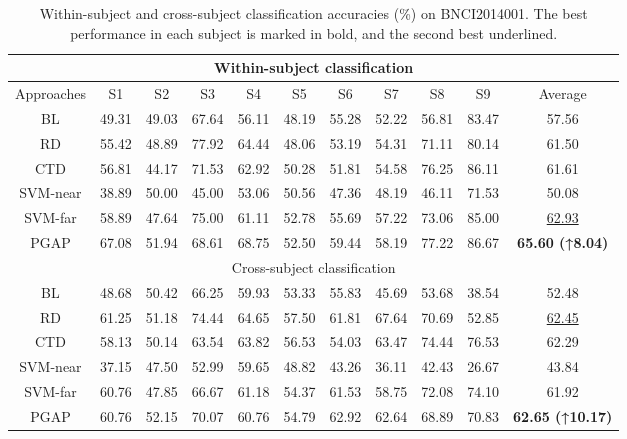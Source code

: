 \documentclass[journal,twocolumn]{IEEEtran}
\begin{document}
\begin{table}[htpb] \centering
  \caption{Within-subject and cross-subject classification accuracies (\%) on BNCI2014001. The best performance in each subject is marked in bold, and the second best underlined.}
  \label{tab:2014001-result}
  \begin{tabular}{c|c|c|c|c|c|c|c|c|c|c}
  \toprule
  \multicolumn{11}{c}{Within-subject classification} \\
  \midrule
  Approaches & S1 & S2 & S3 & S4 & S5 & S6 & S7 & S8 & S9 & Average \\
  \midrule
  BL & 49.31 & 49.03 & 67.64 & 56.11 & 48.19 & 55.28 & 52.22 & 56.81 & 83.47 & 57.56 \\
  RD & 55.42 & 48.89 & 77.92 & 64.44 & 48.06 & 53.19 & 54.31 & 71.11 & 80.14 & 61.50 \\
  CTD & 56.81 & 44.17 & 71.53 & 62.92 & 50.28 & 51.81 & 54.58 & 76.25 & 86.11 & 61.61 \\
  SVM-near & 38.89 & 50.00 & 45.00 & 53.06 & 50.56 & 47.36 & 48.19 & 46.11 & 71.53 & 50.08 \\
  SVM-far & 58.89 & 47.64 & 75.00 & 61.11 & 52.78 & 55.69 & 57.22 & 73.06 & 85.00 & \underline{62.93} \\
  PGAP & 67.08 & 51.94 & 68.61 & 68.75 & 52.50 & 59.44 & 58.19 & 77.22 & 86.67 & \textbf{65.60 (↑8.04)} \\
  \midrule
  \multicolumn{11}{c}{Cross-subject classification} \\
  \midrule
  BL & 48.68 & 50.42 & 66.25 & 59.93 & 53.33 & 55.83 & 45.69 & 53.68 & 38.54 & 52.48 \\
  RD & 61.25 & 51.18 & 74.44 & 64.65 & 57.50 & 61.81 & 67.64 & 70.69 & 52.85 & \underline{62.45} \\
  CTD & 58.13 & 50.14 & 63.54 & 63.82 & 56.53 & 54.03 & 63.47 & 74.44 & 76.53 & 62.29 \\
  SVM-near & 37.15 & 47.50 & 52.99 & 59.65 & 48.82 & 43.26 & 36.11 & 42.43 & 26.67 & 43.84 \\
  SVM-far & 60.76 & 47.85 & 66.67 & 61.18 & 54.37 & 61.53 & 58.75 & 72.08 & 74.10 & 61.92 \\
  PGAP & 60.76 & 52.15 & 70.07 & 60.76 & 54.79 & 62.92 & 62.64 & 68.89 & 70.83 & \textbf{62.65 (↑10.17)} \\
  \bottomrule
  \end{tabular}
\end{table}
\end{document}
